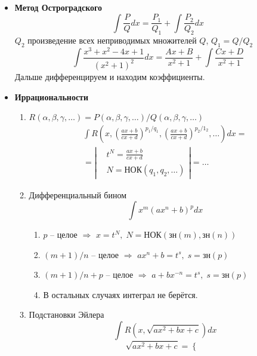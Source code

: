 \documentclass{article}
\newcommand{\x}{\text}
\begin{document}
\begin{itemize}
\begin{enumerate}
          \end{enumerate}
    \item \textbf{Метод Остроградского}
          $$ \int \frac{P}{Q}dx = \frac{P_1}{Q_1} + \int \frac{P_2}{Q_2}dx$$
          $Q_2$ произведение всех неприводимых множителей $Q$, $Q_1 = Q/Q_2$
          $$ \int\frac{x^3+x^2-4x+1}{(x^2+1)^2}dx = \frac{Ax + B}{x^2+1} + \int\frac{Cx + D}{x^2+1} $$
          Дальше дифференцируем и находим коэффициенты.
    \item \textbf{Иррациональности}
          \begin{enumerate}
              \item $R(\alpha,\beta, \gamma,\ldots) = {P(\alpha, \beta, \gamma, \ldots)}/{Q(\alpha, \beta, \gamma, \ldots)} $
                    \begin{multline*}
                        \int R\left(x, \left(\frac{ax + b}{cx+d}\right)^{p_1/q_1}, \left(\frac{ax + b}{cx+ d}\right)^{p_2/1_2}, \ldots \right)dx = \\ = \left|
                        \begin{aligned}
                             & t^N = \frac{ax+b}{cx+d}       \\
                             & N = \x{НОК}(q_1, q_2, \ldots)
                        \end{aligned} \right| = \ldots
                    \end{multline*}
              \item Дифференциальный бином
                    $$ \int x^m (ax^n+b)^pdx $$
                    \begin{enumerate}
                        \item $p$ -- целое $\Rightarrow$ $x = t^N, \; N = \x{НОК}(\x{зн}(m), \x{зн}(n))$
                        \item $(m+1)/{n}$ -- целое $\Rightarrow$ $ax^n+b = t^s, \; s=\x{зн}(p)$
                        \item ${(m+1)}/{n}+p$ -- целое $\Rightarrow$ $a + b x^{-n} = t^s, \; s=\x{зн}(p)$
                        \item В остальных случаях интеграл не берётся.
                    \end{enumerate}
              \item Подстановки Эйлера
                    $$ \int R\left(x, \sqrt{ax^2+bx+c}\right)dx $$
                    \begin{equation*}
                        \sqrt{ax^2+bx+c} = \left\{
                        \begin{aligned}

\end{aligned}
\end{equation*}
\end{enumerate}
\end{itemize}
\end{document}
